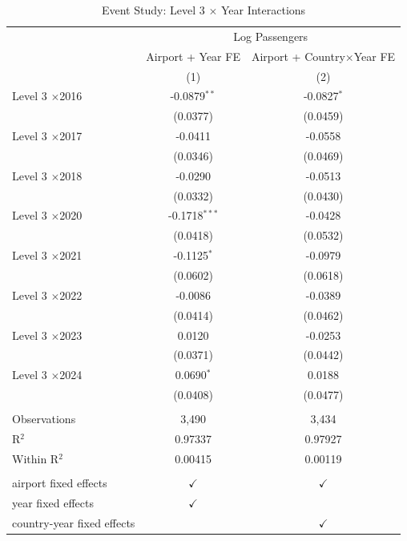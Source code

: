 
\begin{table}[htbp]
   \caption{\label{tab:eventstudy} Event Study: Level 3 $\times$ Year Interactions}
   \bigskip
   \centering
   \begin{tabular}{lcc}
      \toprule
       & \multicolumn{2}{c}{Log Passengers}\\
                                         & Airport + Year FE & Airport + Country$\times$Year FE \\    
                                         & (1)               & (2)\\  
      \midrule 
      Level 3 $\times$2016   & -0.0879$^{**}$    & -0.0827$^{*}$\\   
                                         & (0.0377)          & (0.0459)\\   
      Level 3 $\times$2017   & -0.0411           & -0.0558\\   
                                         & (0.0346)          & (0.0469)\\   
      Level 3 $\times$2018   & -0.0290           & -0.0513\\   
                                         & (0.0332)          & (0.0430)\\   
      Level 3 $\times$2020   & -0.1718$^{***}$   & -0.0428\\   
                                         & (0.0418)          & (0.0532)\\   
      Level 3 $\times$2021   & -0.1125$^{*}$     & -0.0979\\   
                                         & (0.0602)          & (0.0618)\\   
      Level 3 $\times$2022   & -0.0086           & -0.0389\\   
                                         & (0.0414)          & (0.0462)\\   
      Level 3 $\times$2023   & 0.0120            & -0.0253\\   
                                         & (0.0371)          & (0.0442)\\   
      Level 3 $\times$2024   & 0.0690$^{*}$      & 0.0188\\   
                                         & (0.0408)          & (0.0477)\\   
       \\
      Observations                       & 3,490             & 3,434\\  
      R$^2$                              & 0.97337           & 0.97927\\  
      Within R$^2$                       & 0.00415           & 0.00119\\  
       \\
      airport fixed effects              & $\checkmark$      & $\checkmark$\\   
      year fixed effects                 & $\checkmark$      & \\  
      country-year fixed effects         &                   & $\checkmark$\\   
      \bottomrule
   \end{tabular}
   

\end{table}
